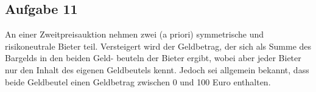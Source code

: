 \documentclass[12pt]{extreport} %
\theoremstyle{named}
\theoremstyle{nnamed}
\theoremstyle{itshape}
\theoremstyle{normal}
\begin{document}
%

\subsection*{Aufgabe 11}

An einer Zweitpreisauktion nehmen zwei (a priori) symmetrische und risikoneutrale Bieter teil. Versteigert wird der Geldbetrag, der sich als Summe des Bargelds in den beiden Geld- beuteln der Bieter ergibt, wobei aber jeder Bieter nur den Inhalt des eigenen Geldbeutels kennt. Jedoch sei allgemein bekannt, dass beide Geldbeutel einen Geldbetrag zwischen 0 und 100 Euro enthalten.
\end{document}
